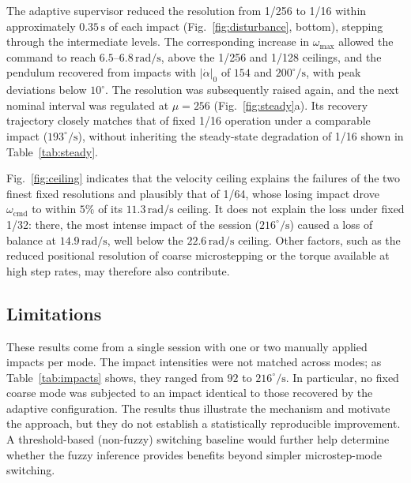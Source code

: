 \documentclass[conference]{IEEEtran}
\begin{document}
The adaptive supervisor reduced the resolution from 1/256 to 1/16 within approximately $0.35\,\mathrm{s}$ of each impact (Fig.~\ref{fig:disturbance}, bottom), stepping through the intermediate levels. The corresponding increase in $\omega_{\max}$ allowed the command to reach $6.5$--$6.8\,\mathrm{rad/s}$, above the 1/256 and 1/128 ceilings, and the pendulum recovered from impacts with $|\dot\alpha|_0$ of $154$ and $200^\circ/\mathrm{s}$, with peak deviations below $10^\circ$. The resolution was subsequently raised again, and the next nominal interval was regulated at $\mu=256$ (Fig.~\ref{fig:steady}a). Its recovery trajectory closely matches that of fixed 1/16 operation under a comparable impact ($193^\circ/\mathrm{s}$), without inheriting the steady-state degradation of 1/16 shown in Table~\ref{tab:steady}.

Fig.~\ref{fig:ceiling} indicates that the velocity ceiling explains the failures of the two finest fixed resolutions and plausibly that of 1/64, whose losing impact drove $\omega_{\mathrm{cmd}}$ to within $5\%$ of its $11.3\,\mathrm{rad/s}$ ceiling. It does not explain the loss under fixed 1/32: there, the most intense impact of the session ($216^\circ/\mathrm{s}$) caused a loss of balance at $14.9\,\mathrm{rad/s}$, well below the $22.6\,\mathrm{rad/s}$ ceiling. Other factors, such as the reduced positional resolution of coarse microstepping or the torque available at high step rates, may therefore also contribute.

\subsection{Limitations}
These results come from a single session with one or two manually applied impacts per mode. The impact intensities were not matched across modes; as Table~\ref{tab:impacts} shows, they ranged from $92$ to $216^\circ/\mathrm{s}$. In particular, no fixed coarse mode was subjected to an impact identical to those recovered by the adaptive configuration. The results thus illustrate the mechanism and motivate the approach, but they do not establish a statistically reproducible improvement. A threshold-based (non-fuzzy) switching baseline would further help determine whether the fuzzy inference provides benefits beyond simpler microstep-mode switching.
\end{document}

